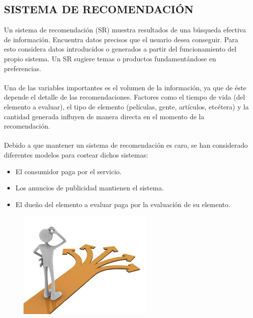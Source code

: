 \documentclass[11pt,a4paper]{article}
\begin{document}
			 \subsection{SISTEMA DE RECOMENDACIÓN}
			 Un sistema de recomendación (SR) muestra resultados de una búsqueda efectiva de información. Encuentra datos precisos que el usuario desea conseguir. Para esto considera datos introducidos o generados a partir del funcionamiento del propio sistema. Un SR sugiere temas o productos fundamentándose en preferencias.\\
			 \\
			 Una de las variables importantes es el volumen de la información, ya que de éste depende el detalle de las recomendaciones. Factores como el tiempo de vida (del elemento a evaluar), el tipo de elemento (películas, gente, artículos, etcétera) y la cantidad generada influyen de manera directa en el momento de la recomendación.\\
			 \\
			 Debido a que mantener un sistema de recomendación es caro, se han considerado diferentes modelos para costear dichos sistemas:
			 	\begin{itemize}
			 		\item El consumidor paga por el servicio.
			 		\item Los anuncios de publicidad mantienen el sistema.
			 		\item El dueño del elemento a evaluar paga por la evaluación de su elemento.
			 	\end{itemize}
		 	
		 		\begin{figure}[H]
		 			\begin{center}
		 				\includegraphics[scale=0.9]{./Imagenes/img01}		
		 			\end{center}
		 		\end{figure}
	 		
\end{document}
